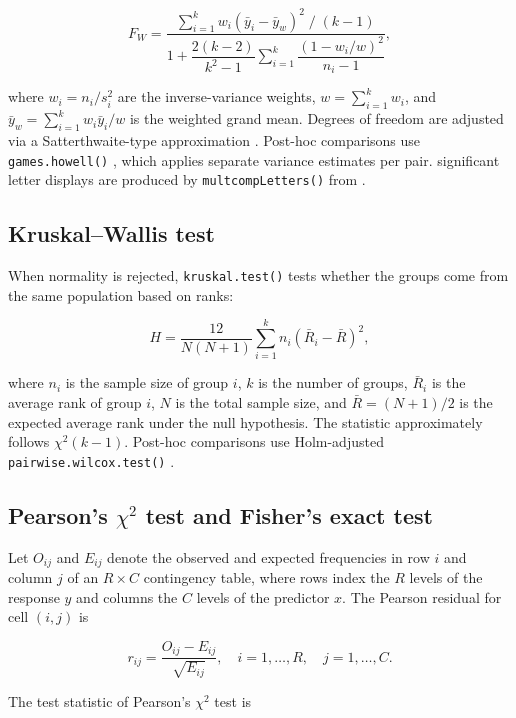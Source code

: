 \[F_W = \frac{\displaystyle\sum_{i=1}^{k} w_i (\bar{y}_i - \bar{y}_w)^2\;/\;(k-1)}
{1 + \dfrac{2(k-2)}{k^2-1} \displaystyle\sum_{i=1}^{k} \dfrac{(1-w_i/w)^2}{n_i-1}},\]

where \(w_i = n_i/s_i^2\) are the inverse-variance weights,
\(w = \sum_{i=1}^{k} w_i\), and
\(\bar{y}_w = \sum_{i=1}^{k} w_i \bar{y}_i / w\) is the weighted grand
mean. Degrees of freedom are adjusted via a Satterthwaite-type
approximation \citep{Satterthwaite:1946}. Post-hoc comparisons use
\texttt{games.howell()} \citep{Games:1976}, which applies separate variance
estimates per pair. significant letter displays are produced by
\texttt{multcompLetters()} from  \citep{Graves:2026}.

\subsection{Kruskal--Wallis test}\label{kw}

When normality is rejected, \texttt{kruskal.test()} \citep{Kruskal:1952} tests
whether the groups come from the same population based on ranks:

\[H = \frac{12}{N(N+1)} \sum_{i=1}^{k} n_i \left(\bar{R}_i - \bar{R}\right)^2,\]

where \(n_i\) is the sample size of group \(i\), \(k\) is the number of
groups, \(\bar{R}_i\) is the average rank of group \(i\), \(N\) is the total
sample size, and \(\bar{R} = (N+1)/2\) is the expected average rank under
the null hypothesis. The statistic approximately follows \(\chi^2(k-1)\).
Post-hoc comparisons use Holm-adjusted \texttt{pairwise.wilcox.test()}
\citep{Holm:1979}.

\subsection{\texorpdfstring{Pearson's \(\chi^2\) test and Fisher's exact test}{Pearson's \textbackslash chi\^{}2 test and Fisher's exact test}}\label{chi}

Let \(O_{ij}\) and \(E_{ij}\) denote the observed and expected frequencies
in row \(i\) and column \(j\) of an \(R \times C\) contingency table, where
rows index the \(R\) levels of the response \(y\) and columns the \(C\) levels
of the predictor \(x\). The Pearson residual for cell \((i,j)\) is

\[r_{ij} = \frac{O_{ij} - E_{ij}}{\sqrt{E_{ij}}}, \quad i = 1,\ldots,R,\quad j = 1,\ldots,C.\]

The test statistic of Pearson's \(\chi^2\) test \citep{Pearson:1900} is

